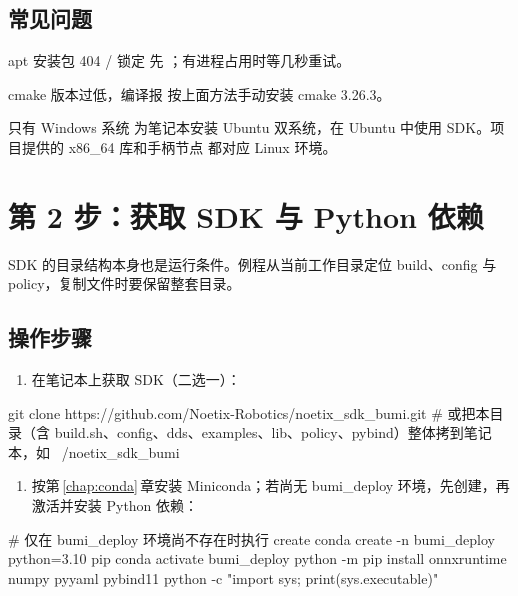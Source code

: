 \subsection*{常见问题}
\begin{faq}{apt 安装包 404 / 锁定}
先 ；有进程占用时等几秒重试。
\end{faq}
\begin{faq}{cmake 版本过低，编译报 }
按上面方法手动安装 cmake 3.26.3。
\end{faq}
\begin{faq}{只有 Windows 系统}
为笔记本安装 Ubuntu 双系统，在 Ubuntu 中使用 SDK。项目提供的 x86\_64 库和手柄节点  都对应 Linux 环境。
\end{faq}


\section{第 2 步：获取 SDK 与 Python 依赖}
\label{step:2}
SDK 的目录结构本身也是运行条件。例程从当前工作目录定位 build、config 与 policy，复制文件时要保留整套目录。


\subsection*{操作步骤}
\begin{enumerate}
\item 在笔记本上获取 SDK（二选一）：

\end{enumerate}
\begin{command}
git clone https://github.com/Noetix-Robotics/noetix_sdk_bumi.git
# 或把本目录（含 build.sh、config、dds、examples、lib、policy、pybind）整体拷到笔记本，如 ~/noetix_sdk_bumi
\end{command}

\begin{enumerate}[resume]
\item 按第\,\ref{chap:conda}\,章安装 Miniconda；若尚无 bumi\_deploy 环境，先创建，再激活并安装 Python 依赖：

\end{enumerate}
\begin{command}
# 仅在 bumi_deploy 环境尚不存在时执行 create
conda create -n bumi_deploy python=3.10 pip
conda activate bumi_deploy
python -m pip install onnxruntime numpy pyyaml pybind11
python -c "import sys; print(sys.executable)"
\end{command}


